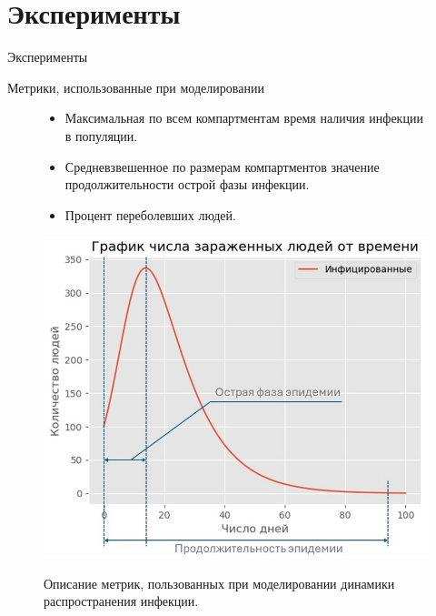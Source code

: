 \documentclass[10pt, unicode, xcolor={svgnames, table, hyperref}]{beamer}
\begin{document}
\section{\small Эксперименты}
\begin{frame}[fragile,t]{Эксперименты}

	\textcolor{DarkBlue!80!LightBlue}{Метрики, использованные при моделировании}

	\begin{figure}[h!]
		\begin{minipage}{0.4\textwidth}
		
			\begin{itemize}
				\item Максимальная по всем компартментам время наличия инфекции в популяции.
				\item Средневзвешенное по размерам компартментов значение продолжительности острой фазы инфекции.
				\item Процент переболевших людей.
			\end{itemize}
		\end{minipage}
		\begin{minipage}{0.58\textwidth}

			\includegraphics[width=1.\textwidth]{img/1.jpg}

			Описание метрик, пользованных при моделировании динамики распространения инфекции.

		\end{minipage}
		\label{fig:disease_spreading_urban}	
	\end{figure}
	

\end{frame}
\end{document}
